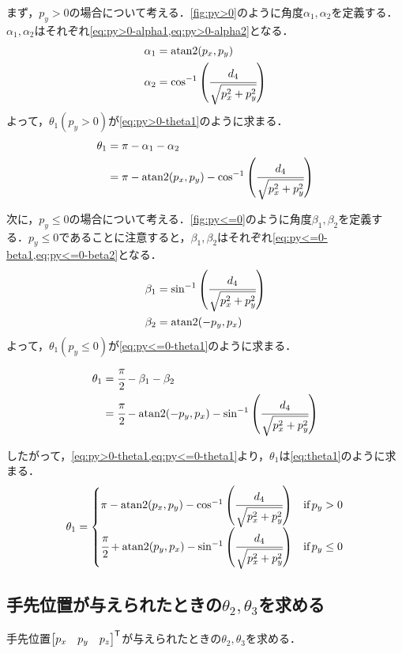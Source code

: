 \documentclass{ltjsarticle}
\begin{document}
まず，$p_y > 0$の場合について考える．\cref{fig:py>0}のように角度$\alpha_1, \alpha_2$を定義する．$\alpha_1, \alpha_2$はそれぞれ\cref{eq:py>0-alpha1,eq:py>0-alpha2}となる．
\begin{align}
	\label{eq:py>0-alpha1}
	\alpha_1 &= \text{atan2}(p_x, p_y) \\
	\label{eq:py>0-alpha2}
	\alpha_2 &= \cos^{-1}\qty(\cfrac{d_4}{\sqrt{p_x^2 + p_y^2}})
\end{align}
よって，$\theta_1 (p_y > 0)$が\cref{eq:py>0-theta1}のように求まる．
\begin{align}
	\theta_1 &= \pi - \alpha_1 - \alpha_2 \\
	\label{eq:py>0-theta1}
	&= \pi - \text{atan2}(p_x, p_y) - \cos^{-1}\qty(\cfrac{d_4}{\sqrt{p_x^2 + p_y^2}})
\end{align}

次に，$p_y \leq 0$の場合について考える．\cref{fig:py<=0}のように角度$\beta_1, \beta_2$を定義する．$p_y \leq 0$であることに注意すると，$\beta_1, \beta_2$はそれぞれ\cref{eq:py<=0-beta1,eq:py<=0-beta2}となる．
\begin{align}
	\label{eq:py<=0-beta1}
	\beta_1 &= \sin^{-1}\qty(\cfrac{d_4}{\sqrt{p_x^2 + p_y^2}}) \\
	\label{eq:py<=0-beta2}
	\beta_2 &= \text{atan2}(-p_y, p_x) \\
\end{align}
よって，$\theta_1 (p_y \leq 0)$が\cref{eq:py<=0-theta1}のように求まる．
\begin{align}
	\theta_1 &= \cfrac{\pi}{2} - \beta_1 - \beta_2 \\
	\label{eq:py<=0-theta1}
	&= \cfrac{\pi}{2} - \text{atan2}(-p_y, p_x) - \sin^{-1}\qty(\cfrac{d_4}{\sqrt{p_x^2 + p_y^2}})
\end{align}

したがって，\cref{eq:py>0-theta1,eq:py<=0-theta1}より，$\theta_1$は\cref{eq:theta1}のように求まる．
\begin{align}
	\label{eq:theta1}
	\theta_1 = 
	\begin{cases}
		\pi - \text{atan2}(p_x, p_y) - \cos^{-1}\qty(\cfrac{d_4}{\sqrt{p_x^2 + p_y^2}}) & \text{if}\,p_y > 0 \\
		\cfrac{\pi}{2} + \text{atan2}(p_y, p_x) - \sin^{-1}\qty(\cfrac{d_4}{\sqrt{p_x^2 + p_y^2}}) & \text{if}\,p_y \leq 0
	\end{cases}
\end{align}

\subsection{手先位置が与えられたときの$\theta_2, \theta_3$を求める}\label{subsec:手先位置が与えられたときのtheta2,theta3を求める}
手先位置$\mqty[p_x & p_y & p_z]^\mathsf{T}$が与えられたときの$\theta_2,\theta_3$を求める．
\end{document}
